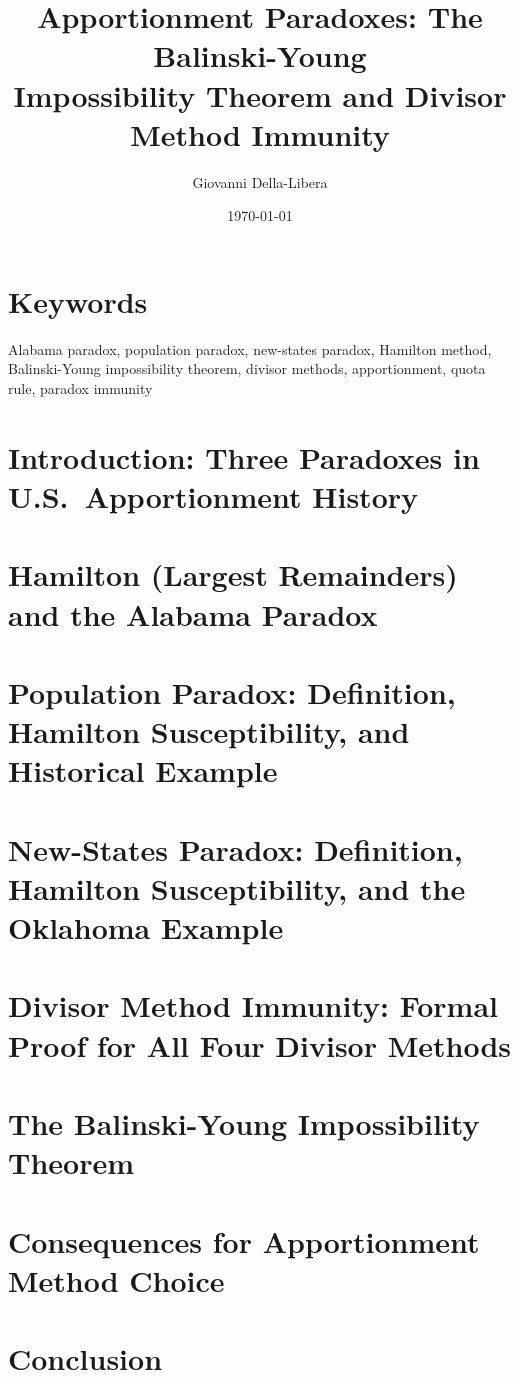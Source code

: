 \documentclass[12pt]{article}
\title{\textbf{Apportionment Paradoxes: The Balinski-Young\\
Impossibility Theorem and Divisor Method Immunity}}
\author{Giovanni Della-Libera}
\date{\today}
\begin{document}
\maketitle

\begin{abstract}

\end{abstract}

\section*{Keywords}
Alabama paradox, population paradox, new-states paradox, Hamilton method,
Balinski-Young impossibility theorem, divisor methods, apportionment,
quota rule, paradox immunity

\section{Introduction: Three Paradoxes in U.S.\ Apportionment History}


\section{Hamilton (Largest Remainders) and the Alabama Paradox}


\section{Population Paradox: Definition, Hamilton Susceptibility, and Historical Example}


\section{New-States Paradox: Definition, Hamilton Susceptibility, and the Oklahoma Example}


\section{Divisor Method Immunity: Formal Proof for All Four Divisor Methods}


\section{The Balinski-Young Impossibility Theorem}


\section{Consequences for Apportionment Method Choice}


\section{Conclusion}




\end{document}
